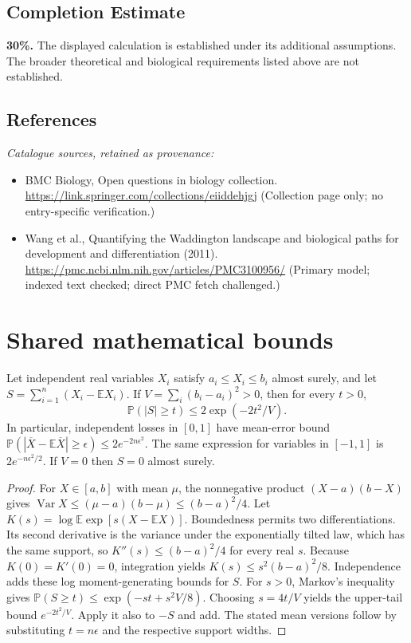 \documentclass[11pt]{article}
\begin{document}
\subsection{Completion Estimate}
\textbf{30\%.} The displayed calculation is established under its additional assumptions. The broader theoretical and biological requirements listed above are not established.
\subsection{References}
\noindent\emph{Catalogue sources, retained as provenance:}
\begin{itemize}
\item BMC Biology, Open questions in biology collection. \url{https://link.springer.com/collections/eiiddehjgj} (Collection page only; no entry-specific verification.)
\item Wang et al., Quantifying the Waddington landscape and biological paths for development and differentiation (2011). \url{https://pmc.ncbi.nlm.nih.gov/articles/PMC3100956/} (Primary model; indexed text checked; direct PMC fetch challenged.)
\end{itemize}




\section{Shared mathematical bounds}\label{app:bounds}
\begin{lemma}\label{lem:bounded}
Let independent real variables $X_i$ satisfy $a_i\leq X_i\leq b_i$ almost surely,
and let $S=\sum_{i=1}^n(X_i-\mathbb{E} X_i)$. If
$V=\sum_i(b_i-a_i)^2>0$, then for every $t>0$,
\[
 \mathbb{P}(|S|\geq t)\leq 2\exp(-2t^2/V).
\]
In particular, independent losses in $[0,1]$ have mean-error bound
$\mathbb{P}(|\overline X-\mathbb{E}\overline X|\geq\epsilon)
\leq2e^{-2n\epsilon^2}$. The same expression for variables in $[-1,1]$
is $2e^{-n\epsilon^2/2}$. If $V=0$ then $S=0$ almost surely.
\end{lemma}
\begin{proof}
For $X\in[a,b]$ with mean $\mu$, the nonnegative product
$(X-a)(b-X)$ gives
$\operatorname{Var} X\leq(\mu-a)(b-\mu)\leq(b-a)^2/4$.
Let $K(s)=\log\mathbb{E}\exp[s(X-\mathbb{E} X)]$.
Boundedness permits two differentiations. Its second derivative is the variance
under the exponentially tilted law, which has the same support, so
$K''(s)\leq(b-a)^2/4$ for every real $s$.
Because $K(0)=K'(0)=0$, integration yields
$K(s)\leq s^2(b-a)^2/8$.
Independence adds these log moment-generating bounds for $S$.
For $s>0$, Markov's inequality gives
$\mathbb{P}(S\geq t)\leq\exp(-st+s^2V/8)$.
Choosing $s=4t/V$ yields the upper-tail bound $e^{-2t^2/V}$.
Apply it also to $-S$ and add. The stated mean versions follow by substituting
$t=n\epsilon$ and the respective support widths.
\end{proof}
\end{document}
